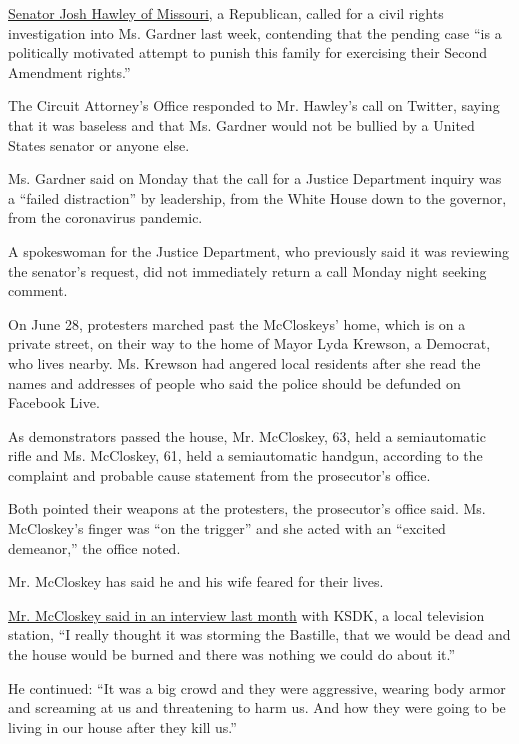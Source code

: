 \href{https://twitter.com/SenHawleyPress/status/1283797174342623232}{Senator
Josh Hawley of Missouri}, a Republican, called for a civil rights
investigation into Ms. Gardner last week, contending that the pending
case ``is a politically motivated attempt to punish this family for
exercising their Second Amendment rights.''

The Circuit Attorney's Office responded to Mr. Hawley's call on Twitter,
saying that it was baseless and that Ms. Gardner would not be bullied by
a United States senator or anyone else.

Ms. Gardner said on Monday that the call for a Justice Department
inquiry was a ``failed distraction'' by leadership, from the White House
down to the governor, from the coronavirus pandemic.

A spokeswoman for the Justice Department, who previously said it was
reviewing the senator's request, did not immediately return a call
Monday night seeking comment.

On June 28, protesters marched past the McCloskeys' home, which is on a
private street, on their way to the home of Mayor Lyda Krewson, a
Democrat, who lives nearby. Ms. Krewson had angered local residents
after she read the names and addresses of people who said the police
should be defunded on Facebook Live.

As demonstrators passed the house, Mr. McCloskey, 63, held a
semiautomatic rifle and Ms. McCloskey, 61, held a semiautomatic handgun,
according to the complaint and probable cause statement from the
prosecutor's office.

Both pointed their weapons at the protesters, the prosecutor's office
said. Ms. McCloskey's finger was ``on the trigger'' and she acted with
an ``excited demeanor,'' the office noted.

Mr. McCloskey has said he and his wife feared for their lives.

\href{https://www.ksdk.com/article/news/local/interview-man-with-rifle-during-st-louis-protest/63-eeb61c07-4adc-4df0-a7d0-000d40a89e78}{Mr.
McCloskey said in an interview last month} with KSDK, a local television
station, ``I really thought it was storming the Bastille, that we would
be dead and the house would be burned and there was nothing we could do
about it.''

He continued: ``It was a big crowd and they were aggressive, wearing
body armor and screaming at us and threatening to harm us. And how they
were going to be living in our house after they kill us.''


